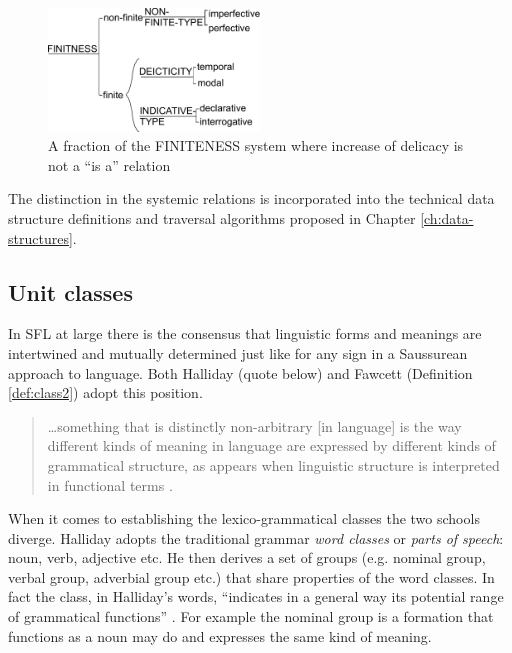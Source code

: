     \begin{figure}[!ht]
        \centering
        \includegraphics[width=0.5\textwidth]{Figures/SFL-grammar/finitness-system.pdf}
        \caption{A fraction of the FINITENESS system where increase of delicacy is not a ``is a'' relation}
        \label{fig:finitness-fraction}
    \end{figure}
    
    The distinction in the systemic relations is incorporated into the technical data structure definitions and traversal algorithms proposed in Chapter \ref{ch:data-structures}.

\subsection{Unit classes}
\label{sec:unit-classes}
    
    In SFL at large there is the consensus that linguistic forms and meanings are intertwined and mutually determined just like for any sign in a Saussurean approach to language. Both Halliday (quote below) and Fawcett (Definition \ref{def:class2}) adopt this position. 
    
    \begin{quotation}
    	\dots something that is distinctly non-arbitrary [in language] is the way different kinds of meaning in language are expressed by different kinds of grammatical structure, as appears when linguistic structure is interpreted in functional terms \citep{Halliday2003-Ideas-about-language}.
    \end{quotation}

    When it comes to establishing the lexico-grammatical classes the two schools diverge. Halliday adopts the traditional grammar \textit{word classes} or \textit{parts of speech}: noun, verb, adjective etc. He then derives a set of groups (e.g. nominal group, verbal group, adverbial group etc.) that share properties of the word classes. In fact the class, in Halliday's words, ``indicates in a general way its potential range of grammatical functions'' \citep[76]{Halliday2013}. For example the nominal group is a formation that functions as a noun may do and expresses the same kind of meaning. 
    
